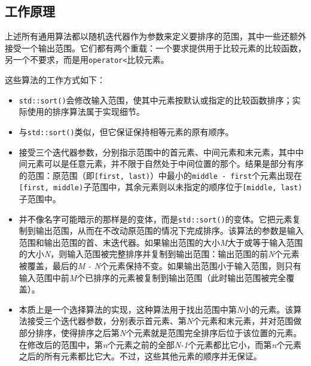
\subsection{工作原理}



上述所有通用算法都以随机迭代器作为参数来定义要排序的范围，其中一些还额外接受一个输出范围。它们都有两个重载：一个要求提供用于比较元素的比较函数，另一个不要求，而是用\texttt{operator<}比较元素。



这些算法的工作方式如下：



\begin{itemize}
\item \texttt{std::\allowbreak{}sort()}会修改输入范围，使其中元素按默认或指定的比较函数排序；实际使用的排序算法属于实现细节。



\item {}与\texttt{std::\allowbreak{}sort()}类似，但它保证保持相等元素的原有顺序。



\item {}接受三个迭代器参数，分别指示范围中的首元素、中间元素和末元素，其中中间元素可以是任意元素，并不限于自然处于中间位置的那个。结果是部分有序的范围：原范围（即\texttt{[first, last)}）中最小的\texttt{middle - first}个元素出现在\texttt{[first, middle)}子范围中，其余元素则以未指定的顺序位于\texttt{[middle, last)}子范围中。



\item {}并不像名字可能暗示的那样是的变体，而是\texttt{std::\allowbreak{}sort()}的变体。它把元素复制到输出范围，从而在不改动原范围的情况下完成排序。该算法的参数是输入范围和输出范围的首、末迭代器。如果输出范围的大小\textit{M}大于或等于输入范围的大小\textit{N}，则输入范围被完整排序并复制到输出范围：输出范围的前\textit{N}个元素被覆盖，最后的\textit{M - N}个元素保持不变。如果输出范围小于输入范围，则只有输入范围中前\textit{M}个已排序的元素被复制到输出范围（此时输出范围被完全覆盖）。



\item {}本质上是一个选择算法的实现，这种算法用于找出范围中第\textit{N}小的元素。该算法接受三个迭代器参数，分别表示首元素、第\textit{N}个元素和末元素，并对范围做部分排序，使得排序之后第\textit{N}个元素就是范围完全排序后位于该位置的元素。在修改后的范围中，第\textit{n}个元素之前的全部\textit{N-1}个元素都比它小，而第\textit{n}个元素之后的所有元素都比它大。不过，这些其他元素的顺序并无保证。



\end{itemize}
